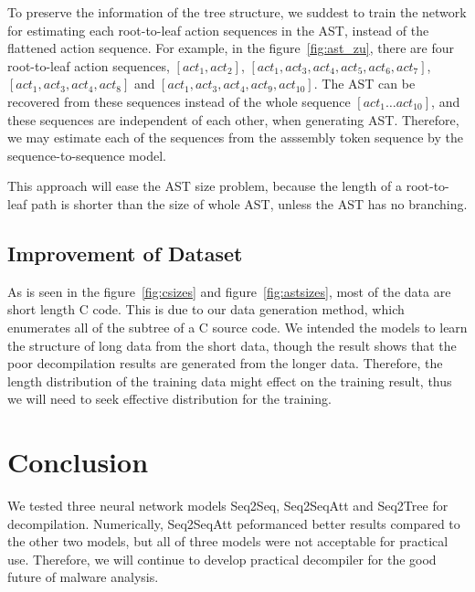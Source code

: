 \documentclass[senior,final,11pt]{iscs-thesis}
\begin{document}
To preserve the information of the tree structure, we suddest to train the network for estimating each root-to-leaf action sequences in the AST,
instead of the flattened action sequence. 
For example, in the figure~\ref{fig:ast_zu}, there are four root-to-leaf action sequences, 
$ [act_1, act_2] $, $ [act_1, act_3,act_4,act_5,act_6,act_7] $, $ [act_1, act_3,act_4,act_8] $ and $ [act_1, act_3,act_4,act_9,act_{10}] $.
The AST can be recovered from these sequences instead of the whole sequence $ [act_1 \dots act_{10}] $, 
and these sequences are independent of each other, when generating AST.
Therefore, we may estimate each of the sequences from the asssembly token sequence by the sequence-to-sequence model.

This approach will ease the AST size problem, because the length of a root-to-leaf path is shorter than the size of whole AST, unless the AST has no branching.







\section{Improvement of Dataset}
As is seen in the figure~\ref{fig:csizes} and figure~\ref{fig:astsizes}, most of the data are short length C code.
This is due to our data generation method, which enumerates all of the subtree of a C source code.
We intended the models to learn the structure of long data from the short data, though the result shows that 
the poor decompilation results are generated from the longer data.
Therefore, the length distribution of the training data might effect on the training result, 
thus we will need to seek effective distribution for the training.





\chapter{Conclusion}
We tested three neural network models Seq2Seq, Seq2SeqAtt and Seq2Tree for decompilation.
Numerically, Seq2SeqAtt peformanced better results compared to the other two models,
but all of three models were not acceptable for practical use.
Therefore, we will continue to develop practical decompiler for the good future of malware analysis.
\end{document}
